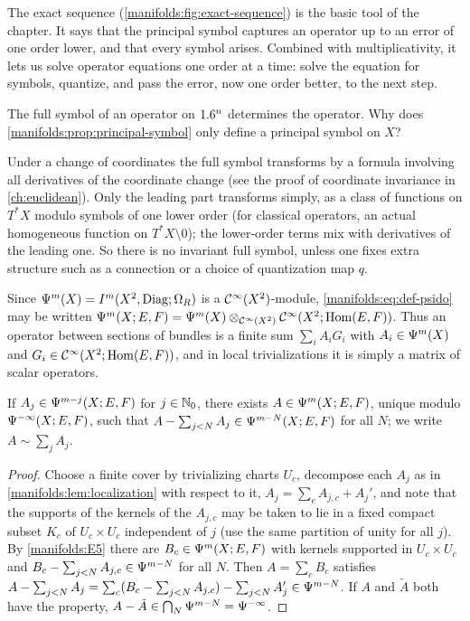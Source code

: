 The exact sequence (\cref{manifolds:fig:exact-sequence}) is the basic tool
of the chapter. It says that the principal symbol captures an operator up to
an error of one order lower, and that every symbol arises. Combined with
multiplicativity, it lets us solve operator equations one order at a time:
solve the equation for symbols, quantize, and pass the error, now one order
better, to the next step.

\begin{question}
The full symbol of an operator on $1.6^n$ determines the operator. Why does
\cref{manifolds:prop:principal-symbol} only define a principal symbol on $X$?
\end{question}
\begin{answer}
Under a change of coordinates the full symbol transforms by a formula
involving all derivatives of the coordinate change (see the proof of
coordinate invariance in \cref{ch:euclidean}). Only the leading part
transforms simply, as a class of functions on $T^*X$ modulo symbols of one
lower order (for classical operators, an actual homogeneous function on
$T^*X\setminus0$); the lower-order terms mix with
derivatives of the leading one. So there is no invariant full symbol, unless
one fixes extra structure such as a connection or a choice of quantization
map $q$.
\end{answer}

\begin{remark}\label{manifolds:rem:high-road}
Since $\Psi^{m}(X)=I^{m}(X^2,\operatorname{Diag};\Omega_R)$ is a $\mathcal{C}^\infty(X^2)$-module,
\eqref{manifolds:eq:def-psido} may be written
$\Psi^{m}(X;E,F)=\Psi^{m}(X)\otimes_{\mathcal{C}^\infty(X^2)}\mathcal{C}^\infty(X^2;\operatorname{Hom}(E,F))$. Thus an operator
between sections of bundles is a finite sum $\sum_iA_iG_i$ with $A_i\in\Psi^{m}(X)$
and $G_i\in\mathcal{C}^\infty(X^2;\operatorname{Hom}(E,F))$, and in local trivializations it is simply a matrix
of scalar operators.
\end{remark}

\begin{proposition}\label{manifolds:prop:asymptotic}
If $A_j\in\Psi^{m-j}(X;E,F)$ for $j\in\mathbb{N}_0$, there exists $A\in\Psi^{m}(X;E,F)$,
unique modulo $\Psi^{-\infty}(X;E,F)$, such that
$A-\sum_{j<N}A_j\in\Psi^{m-N}(X;E,F)$ for all $N$; we write $A\sim\sum_jA_j$.
\end{proposition}
\begin{proof}
Choose a finite cover by trivializing charts $U_c$, decompose each $A_j$ as in
\cref{manifolds:lem:localization} with respect to it,
$A_j=\sum_cA_{j,c}+A_j'$, and note that the supports of the kernels of the $A_{j,c}$
may be taken to lie in a fixed compact subset $K_c$ of $U_c\times U_c$ independent of
$j$ (use the same partition of unity for all $j$). By \ref{manifolds:E5} there are
$B_c\in\Psi^{m}(X;E,F)$ with kernels supported in $U_c\times U_c$ and
$B_c-\sum_{j<N}A_{j,c}\in\Psi^{m-N}$ for all $N$. Then $A=\sum_cB_c$ satisfies
$A-\sum_{j<N}A_j=\sum_c(B_c-\sum_{j<N}A_{j,c})-\sum_{j<N}A_j'\in\Psi^{m-N}$. If $A$ and
$\tilde A$ both have the property, $A-\tilde A\in\bigcap_N\Psi^{m-N}=\Psi^{-\infty}$.
\end{proof}

